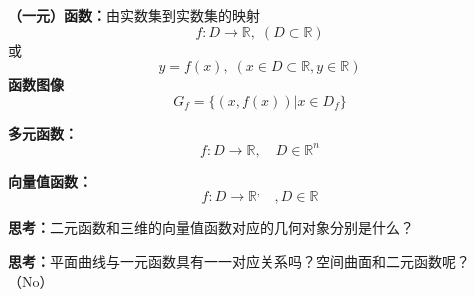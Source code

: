 	{\bf （一元）函数：}由实数集到实数集的映射
	$$f:D\to\mathbb{R},\;(D\subset\mathbb{R})$$
	或
	$$y=f(x),\;(x\in D\subset\mathbb{R},y\in\mathbb{R})$$
	{\bf 函数图像}
	$$G_f=\{(x,f(x))|x\in D_f\}$$
	
	\begin{shaded}
		{\bf 多元函数：} 
		$$f:D\to\mathbb{R},\quad D\in\mathbb{R}^n$$
		
		{\bf 向量值函数：}
		$$f:D\to\mathbb{R}^,\quad, D\in\mathbb{R}$$
		
		{\bf 思考：}二元函数和三维的向量值函数对应的几何对象分别是什么？
		
		{\bf 思考：}平面曲线与一元函数具有一一对应关系吗？空间曲面和二元函数呢？ （No）	
	\end{shaded}	
		\begin{center}
			\quad	
		\end{center}
	
